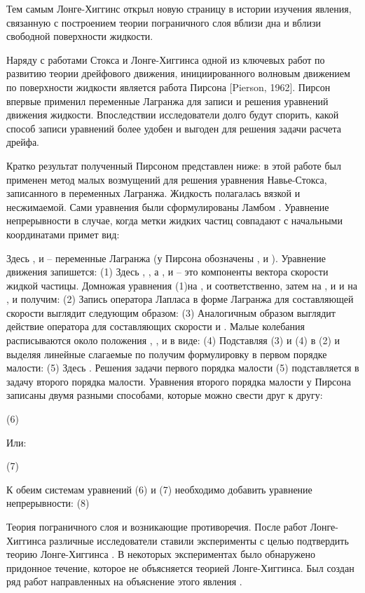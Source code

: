 Тем самым Лонге-Хиггинс открыл новую страницу в истории изучения явления, связанную с построением теории пограничного слоя вблизи дна и вблизи свободной поверхности жидкости.

Наряду с работами Стокса \cite{Stokes} и Лонге-Хиггинса \cite{longuet1953mass, longuet1960mass} одной из ключевых работ по развитию теории дрейфового движения, инициированного волновым движением по поверхности жидкости является работа Пирсона [Pierson, 1962]. Пирсон впервые применил переменные Лагранжа для записи и решения уравнений движения жидкости. Впоследствии исследователи долго будут спорить, какой способ записи уравнений более удобен и выгоден для решения задачи расчета дрейфа.

Кратко результат полученный Пирсоном представлен ниже: в этой работе был применен метод малых возмущений для решения уравнения Навье-Стокса, записанного в переменных Лагранжа. Жидкость полагалась вязкой и несжимаемой. Сами уравнения были сформулированы Ламбом \cite{lamb1932hydrodynamics}. Уравнение непрерывности в случае, когда метки жидких частиц совпадают с начальными координатами примет вид:

Здесь  ,   и   – переменные Лагранжа (у Пирсона обозначены  ,   и  ). Уравнение движения запишется:
(1)
Здесь  ,  , а  ,   и   – это компоненты вектора скорости жидкой частицы. Домножая уравнения (1)на  ,   и   соответственно, затем на  ,   и   и на  ,   и  получим:
(2)
Запись оператора Лапласа   в форме Лагранжа для составляющей скорости   выглядит следующим образом:
(3)
Аналогичным образом выглядит действие оператора для составляющих скорости   и  .
Малые колебания расписываются около положения  ,  ,   и   в виде:
(4)
Подставляя (3) и (4) в (2) и выделяя линейные слагаемые по   получим формулировку в первом порядке малости:
(5)
Здесь  .
Решения задачи первого порядка малости (5) подставляется в задачу второго порядка малости. Уравнения второго порядка малости у Пирсона записаны двумя разными способами, которые можно свести друг к другу:

(6)

Или:

(7)

К обеим системам уравнений (6) и (7) необходимо добавить уравнение непрерывности:
(8)



Теория пограничного слоя и возникающие противоречия.
После работ Лонге-Хиггинса различные исследователи ставили эксперименты с целью подтвердить теорию Лонге-Хиггинса \cite{longuet1953mass}. В некоторых экспериментах было обнаружено придонное течение, которое не объясняется теорией Лонге-Хиггинса. Был создан ряд работ направленных на объяснение этого явления \cite{Dore and others}. 

